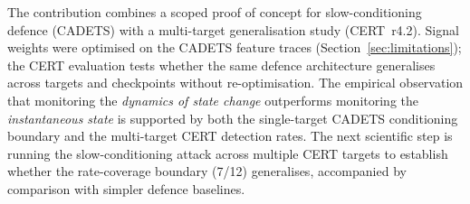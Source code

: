 \documentclass[10pt,twocolumn]{article}
\begin{document}
The contribution combines a scoped proof of concept for slow-conditioning
defence (CADETS) with a multi-target generalisation study (CERT~r4.2).
Signal weights were optimised on the CADETS feature traces
(Section~\ref{sec:limitations}); the CERT evaluation tests whether the
same defence architecture generalises across targets and checkpoints
without re-optimisation.  The empirical observation that monitoring the
\emph{dynamics of state change} outperforms monitoring
the \emph{instantaneous state} is supported by both the single-target
CADETS conditioning boundary and the multi-target CERT detection rates.
The next scientific step is running the slow-conditioning attack across
multiple CERT targets to establish whether the rate-coverage boundary
(7/12) generalises, accompanied by comparison with simpler defence
baselines.

\balance


\end{document}
